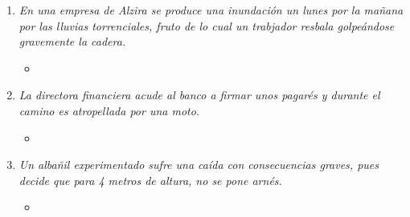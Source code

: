 \documentclass{article}
\begin{document}
\begin{enumerate}[label=(\alph*)]
            \begin{itemize}
              \item
            \end{itemize}
          \item \textit{En una empresa de Alzira se produce una inundación un lunes por la mañana por las lluvias torrenciales, fruto de lo cual un trabjador resbala golpeándose gravemente la cadera.}
            \begin{itemize}
              \item 
            \end{itemize}
          \item \textit{La directora financiera acude al banco a firmar unos pagarés y durante el camino es atropellada por una moto.}
            \begin{itemize}
              \item 
            \end{itemize}
          \item \textit{Un albañil experimentado sufre una caída con consecuencias graves, pues decide que para 4 metros de altura, no se pone arnés.}
            \begin{itemize}
              \item 
            \end{itemize}
        \end{enumerate}
    
    \newpage
\end{document}
